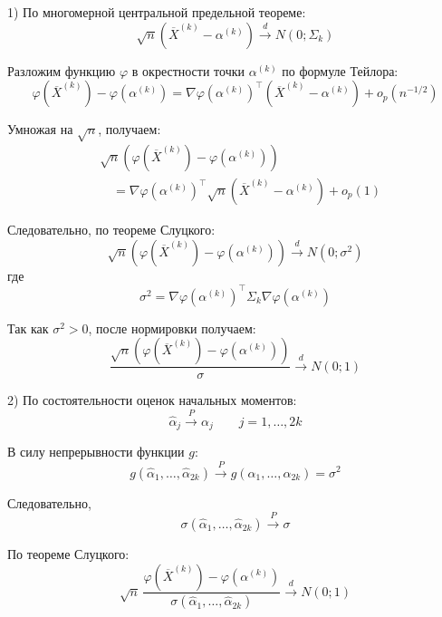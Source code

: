 \documentclass[12pt,a4paper]{article}
\begin{document}
\begin{proofbox}{}
1) По многомерной центральной предельной теореме:
\[
\sqrt{n}\left(
\overline{X}^{(k)}-\alpha^{(k)}
\right)
\xrightarrow{d}N(0;\Sigma_k)
\]

Разложим функцию $\varphi$ в окрестности точки $\alpha^{(k)}$ по формуле Тейлора:
\[
\varphi(\overline{X}^{(k)})
-
\varphi(\alpha^{(k)})
=
\nabla\varphi(\alpha^{(k)})^\top
\left(
\overline{X}^{(k)}-\alpha^{(k)}
\right)
+
o_p(n^{-1/2})
\]

Умножая на $\sqrt{n}$, получаем:
\[
\begin{aligned}
&\sqrt{n}\left(
\varphi(\overline{X}^{(k)})
-
\varphi(\alpha^{(k)})
\right)
\\
&\quad=
\nabla\varphi(\alpha^{(k)})^\top
\sqrt{n}\left(
\overline{X}^{(k)}-\alpha^{(k)}
\right)
+o_p(1)
\end{aligned}
\]

Следовательно, по теореме Слуцкого:
\[
\sqrt{n}\left(
\varphi(\overline{X}^{(k)})
-
\varphi(\alpha^{(k)})
\right)
\xrightarrow{d}N(0;\sigma^2)
\]
где
\[
\sigma^2
=
\nabla\varphi(\alpha^{(k)})^\top
\Sigma_k
\nabla\varphi(\alpha^{(k)})
\]

Так как $\sigma^2>0$, после нормировки получаем:
\[
\frac{
\sqrt{n}\left(
\varphi(\overline{X}^{(k)})
-
\varphi(\alpha^{(k)})
\right)
}{\sigma}
\xrightarrow{d}N(0;1)
\]

2) По состоятельности оценок начальных моментов:
\[
\widehat{\alpha}_j
\xrightarrow{P}\alpha_j
\qquad j=1,\ldots,2k
\]

В силу непрерывности функции $g$:
\[
g(\widehat{\alpha}_1,\ldots,\widehat{\alpha}_{2k})
\xrightarrow{P}
g(\alpha_1,\ldots,\alpha_{2k})
=\sigma^2
\]

Следовательно,
\[
\sigma(\widehat{\alpha}_1,\ldots,\widehat{\alpha}_{2k})
\xrightarrow{P}\sigma
\]

По теореме Слуцкого:
\[
\sqrt{n}\,
\frac{
\varphi(\overline{X}^{(k)})
-
\varphi(\alpha^{(k)})
}{
\sigma(\widehat{\alpha}_1,\ldots,\widehat{\alpha}_{2k})
}
\xrightarrow{d}N(0;1)
\]
\end{proofbox}
\end{document}
